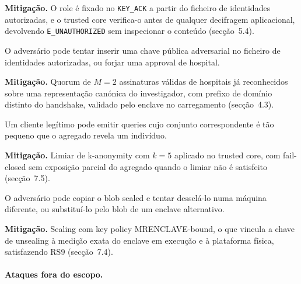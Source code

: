 \begin{description}
  \textbf{Mitigação.} O role é fixado no \texttt{KEY\_ACK} a partir do ficheiro de identidades autorizadas, e o trusted core verifica-o antes de qualquer decifragem aplicacional, devolvendo \texttt{E\_UNAUTHORIZED} sem inspecionar o conteúdo (secção~5.4).
  \item[A7, admissão de identidade não autorizada.] O adversário pode tentar inserir uma chave pública adversarial no ficheiro de identidades autorizadas, ou forjar uma approval de hospital.

  \textbf{Mitigação.} Quorum de $M=2$ assinaturas válidas de hospitais já reconhecidos sobre uma representação canónica do investigador, com prefixo de domínio distinto do handshake, validado pelo enclave no carregamento (secção~4.3).
  \item[A8, inferência por agregados.] Um cliente legítimo pode emitir queries cujo conjunto correspondente é tão pequeno que o agregado revela um indivíduo.

  \textbf{Mitigação.} Limiar de k-anonymity com $k=5$ aplicado no trusted core, com fail-closed sem exposição parcial do agregado quando o limiar não é satisfeito (secção~7.5).
  \item[A9, leitura ou troca do estado persistido.] O adversário pode copiar o blob sealed e tentar desselá-lo numa máquina diferente, ou substituí-lo pelo blob de um enclave alternativo.

  \textbf{Mitigação.} Sealing com key policy MRENCLAVE-bound, o que vincula a chave de unsealing à medição exata do enclave em execução e à plataforma física, satisfazendo RS9 (secção~7.4).
\end{description}

\paragraph{Ataques fora do escopo.}


